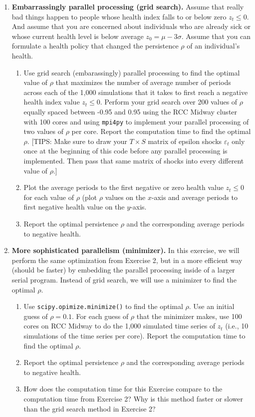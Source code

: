 \documentclass[letterpaper,12pt]{article}
\theoremstyle{definition}
\newcommand\ve{\varepsilon}
\begin{document}
\begin{enumerate}
  \newpage
  \item \textbf{Embarrassingly parallel processing (grid search).} Assume that really bad things happen to people whose health index falls to or below zero $z_t\leq 0$. And assume that you are concerned about individuals who are already sick or whose current health level is below average $z_0=\mu - 3\sigma$. Assume that you can formulate a health policy that changed the persistence $\rho$ of an individual's health.
  \begin{enumerate}
    \item Use grid search (embarassingly) parallel processing to find the optimal value of $\rho$ that maximizes the number of average number of periods across each of the 1,000 simulations that it takes to first reach a negative health index value $z_t\leq 0$. Perform your grid search over 200 values of $\rho$ equally spaced between -0.95 and 0.95 using the RCC Midway cluster with 100 cores and using \texttt{mpi4py} to implement your parallel processing of two values of $\rho$ per core. Report the computation time to find the optimal $\rho$. [TIPS: Make sure to draw your $T\times S$ matrix of epsilon shocks $\ve_t$ only once at the beginning of this code before any parallel processing is implemented. Then pass that same matrix of shocks into every different value of $\rho$.]
    \item Plot the average periods to the first negative or zero health value $z_t\leq 0$ for each value of $\rho$ (plot $\rho$ values on the $x$-axis and average periods to first negative health value on the $y$-axis.
    \item Report the optimal persistence $\rho$ and the corresponding average periods to negative health.
  \end{enumerate}

  \item \textbf{More sophisticated parallelism (minimizer).} In this exercise, we will perform the same optimization from Exercise 2, but in a more efficient way (should be faster) by embedding the parallel processing inside of a larger serial program. Instead of grid search, we will use a minimizer to find the optimal $\rho$.
  \begin{enumerate}
    \item Use \texttt{scipy.opimize.minimize()} to find the optimal $\rho$. Use an initial guess of $\rho=0.1$. For each guess of $\rho$ that the minimizer makes, use 100 cores on RCC Midway to do the 1,000 simulated time series of $z_t$ (i.e., 10 simulations of the time series per core). Report the computation time to find the optimal $\rho$.
    \item Report the optimal persistence $\rho$ and the corresponding average periods to negative health.
    \item How does the computation time for this Exercise compare to the computation time from Exercise 2? Why is this method faster or slower than the grid search method in Exercise 2?
  \end{enumerate}
\end{enumerate}




% 
\end{document}
